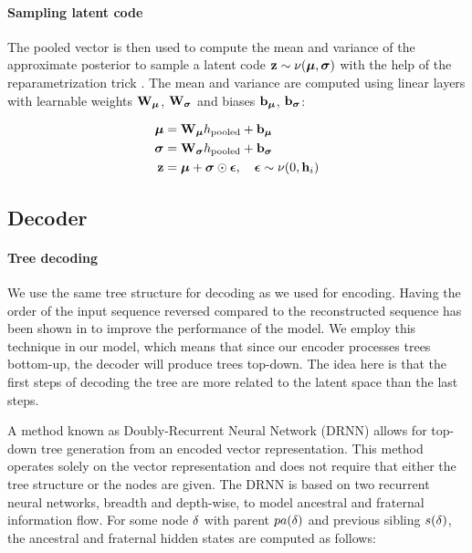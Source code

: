 \paragraph{Sampling latent code} The pooled vector is then used to compute the mean and variance of the approximate posterior to sample a latent code $\mathbf{z} \sim \nu(\boldsymbol\mu, \boldsymbol\sigma)$ with the help of the reparametrization trick \cite{kingma2013auto}. The mean and variance are computed using linear layers with learnable weights $\mathbf{W}_{\boldsymbol\mu}$, $\mathbf{W}_{\boldsymbol\sigma}$ and biases $\mathbf{b}_{\boldsymbol\mu}$, $\mathbf{b}_{\boldsymbol\sigma}$:

\begin{align}
\boldsymbol\mu& = \mathbf{W}_{\boldsymbol\mu} h_\text{pooled} + \mathbf{b}_{\boldsymbol\mu} \\
\boldsymbol\sigma& = \mathbf{W}_{\boldsymbol\sigma} h_\text{pooled} + \mathbf{b}_{\boldsymbol\sigma} \\
\mathbf{z} & = \boldsymbol\mu+ \boldsymbol\sigma\odot \boldsymbol{\epsilon}, \quad \boldsymbol{\epsilon} \sim \nu(0, \mathbf{h}_i)
\end{align}
\newpage
\subsection{Decoder}
\label{sec:decoder}

\paragraph{Tree decoding} We use the same tree structure for decoding as we used for encoding. 
Having the order of the input sequence reversed compared to the reconstructed sequence has been shown in \cite{fabius2015variational} to improve the performance of the model. 
We employ this technique in our model, which means that since our encoder processes trees bottom-up, the decoder will produce trees top-down. 
The idea here is that the first steps of decoding the tree are more related to the latent space than the last steps.



A method known as Doubly-Recurrent Neural Network (DRNN) \cite{alvarezmelis2017tree} allows for top-down tree generation from an encoded vector representation. This method operates solely on the vector representation and does not require that either the tree structure or the nodes are given. The DRNN is based on two recurrent neural networks, breadth and depth-wise, to model ancestral and fraternal information flow. For some node $\delta$ with parent $pa(\delta)$ and previous sibling $s(\delta)$, the ancestral and fraternal hidden states are computed as follows:

